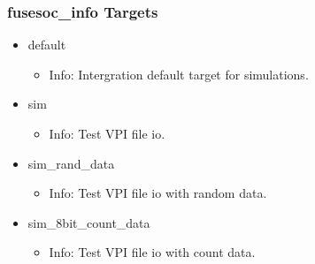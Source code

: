 \subsubsection{fusesoc\_info Targets}
\begin{itemize}
\item default
	\begin{itemize}
	\item[$\space$] Info: Intergration default target for simulations.
	\end{itemize}
\item sim
	\begin{itemize}
	\item[$\space$] Info: Test VPI file io.
	\end{itemize}
\item sim\_rand\_data
	\begin{itemize}
	\item[$\space$] Info: Test VPI file io with random data.
	\end{itemize}
\item sim\_8bit\_count\_data
	\begin{itemize}
	\item[$\space$] Info: Test VPI file io with count data.
	\end{itemize}
\end{itemize}
